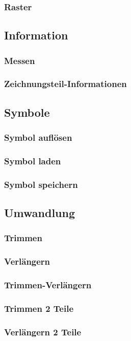 \documentclass[a4paper]{book}
\begin{document}
			\subsubsection{Raster} 
		\subsection{Information}
			\subsubsection{Messen} 
			\subsubsection{Zeichnungsteil-Informationen} 
		\subsection{Symbole}
			\subsubsection{Symbol auflösen}
			\subsubsection{Symbol laden} 
			\subsubsection{Symbol speichern} 
		\subsection{Umwandlung}		
			\subsubsection{Trimmen} 
			\subsubsection{Verlängern} 
			\subsubsection{Trimmen-Verlängern} 
			\subsubsection{Trimmen 2 Teile} 
			\subsubsection{Verlängern 2 Teile} 
\end{document}
